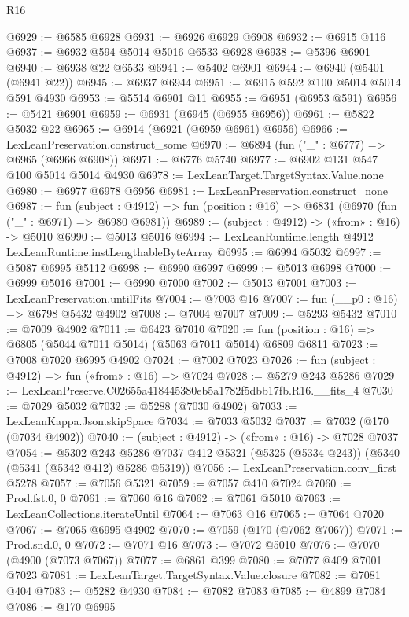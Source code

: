 \begin{lexlean}{R16}
\begin{coremodule}
@6929 := @6585 @6928
@6931 := @6926 @6929 @6908
@6932 := @6915 @116
@6937 := @6932 @594 @5014 @5016 @6533 @6928
@6938 := @5396 @6901
@6940 := @6938 @22 @6533
@6941 := @5402 @6901
@6944 := @6940 (@5401 (@6941 @22))
@6945 := @6937 @6944
@6951 := @6915 @592 @100 @5014 @5014 @591 @4930
@6953 := @5514 @6901 @11
@6955 := @6951 (@6953 @591)
@6956 := @5421 @6901
@6959 := @6931 (@6945 (@6955 @6956))
@6961 := @5822 @5032 @22
@6965 := @6914 (@6921 (@6959 @6961) @6956)
@6966 := LexLeanPreservation.construct_some
@6970 := @6894 (fun ("_" : @6777) => @6965 (@6966 @6908))
@6971 := @6776 @5740
@6977 := @6902 @131 @547 @100 @5014 @5014 @4930
@6978 := LexLeanTarget.TargetSyntax.Value.none
@6980 := @6977 @6978 @6956
@6981 := LexLeanPreservation.construct_none
@6987 := fun (subject : @4912) =>
  fun (position : @16) => @6831 (@6970 (fun ("_" : @6971) => @6980 @6981))
@6989 := (subject : @4912) -> («from» : @16) -> @5010
@6990 := @5013 @5016
@6994 := LexLeanRuntime.length @4912 LexLeanRuntime.instLengthableByteArray
@6995 := @6994 @5032
@6997 := @5087 @6995 @5112
@6998 := @6990 @6997
@6999 := @5013 @6998
@7000 := @6999 @5016
@7001 := @6990 @7000
@7002 := @5013 @7001
@7003 := LexLeanPreservation.untilFits
@7004 := @7003 @16
@7007 := fun (__p0 : @16) => @6798 @5432 @4902
@7008 := @7004 @7007
@7009 := @5293 @5432
@7010 := @7009 @4902
@7011 := @6423 @7010
@7020 := fun (position : @16) => @6805 (@5044 @7011 @5014) (@5063 @7011 @5014) @6809 @6811
@7023 := @7008 @7020 @6995 @4902
@7024 := @7002 @7023
@7026 := fun (subject : @4912) => fun («from» : @16) => @7024
@7028 := @5279 @243 @5286
@7029 := LexLeanPreserve.C02655a418445380eb5a1782f5dbb17fb.R16.__fits_4
@7030 := @7029 @5032
@7032 := @5288 (@7030 @4902)
@7033 := LexLeanKappa.Json.skipSpace
@7034 := @7033 @5032
@7037 := @7032 (@170 (@7034 @4902))
@7040 := (subject : @4912) -> («from» : @16) -> @7028 @7037
@7054 := @5302
    @243
    @5286
    @7037
    @412
    @5321
    (@5325 (@5334 @243))
    (@5340 (@5341 (@5342 @412) @5286 @5319))
@7056 := LexLeanPreservation.conv_first @5278
@7057 := @7056 @5321
@7059 := @7057 @410 @7024
@7060 := Prod.fst.{0, 0}
@7061 := @7060 @16
@7062 := @7061 @5010
@7063 := LexLeanCollections.iterateUntil
@7064 := @7063 @16
@7065 := @7064 @7020
@7067 := @7065 @6995 @4902
@7070 := @7059 (@170 (@7062 @7067))
@7071 := Prod.snd.{0, 0}
@7072 := @7071 @16
@7073 := @7072 @5010
@7076 := @7070 (@4900 (@7073 @7067))
@7077 := @6861 @399
@7080 := @7077 @409 @7001 @7023
@7081 := LexLeanTarget.TargetSyntax.Value.closure
@7082 := @7081 @404
@7083 := @5282 @4930
@7084 := @7082 @7083
@7085 := @4899 @7084
@7086 := @170 @6995

\end{coremodule}
\end{lexlean}
